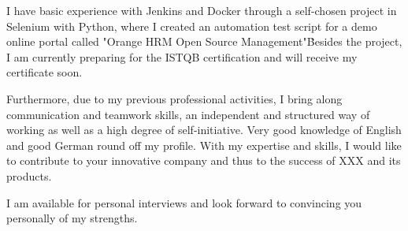 \documentclass[11.5pt,a4paper,sans]{moderncv}        %
\begin{document}
I have basic experience with Jenkins and Docker through a self-chosen project in Selenium with Python, where I created an automation test script for a demo online portal called "Orange HRM Open Source Management"\. Besides the project, I am currently preparing for the ISTQB certification and will receive my certificate soon. 

Furthermore, due to my previous professional activities, I bring along communication and teamwork skills, an independent and structured way of working as well as a high degree of self-initiative. Very good knowledge of English and good German round off my profile. With my expertise and skills, I would like to contribute to your innovative company and thus to the success of XXX and its products.

I am available for personal interviews and look forward to convincing you personally of my strengths.



\makeletterclosing
\vspace{0.5mm}
\end{document}
